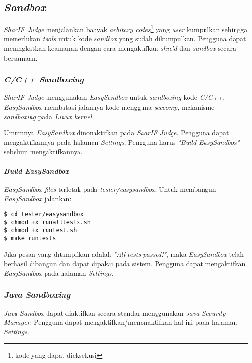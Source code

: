 \subsection{\textit{Sandbox}}
\label{subsec:sandbox}
\textit{SharIF Judge} menjalankan banyak \textit{arbitary codes}\footnote{kode yang dapat dieksekusi} yang \textit{user} kumpulkan sehingga memerlukan \textit{tools} untuk kode \textit{sandbox} yang sudah dikumpulkan. Pengguna dapat meningkatkan keamanan dengan cara mengaktifkan \textit{shield} dan \textit{sandbox} secara bersamaan.

\subsubsection{\textit{C/C++ Sandboxing}}
\label{subsubsec:sandbox_c/c++}
\textit{SharIF Judge} menggunakan \textit{EasySandbox} untuk \textit{sandboxing} kode \textit{C/C++}. \textit{EasySandbox} membatasi jalannya kode mengguna \textit{seccomp}, mekanisme \textit{sandboxing} pada \textit{Linux kernel}.

Umumnya \textit{EasySandbox} dinonaktifkan pada \textit{SharIF Judge}. Pengguna dapat mengaktifkannya pada halaman \textit{Settings}. Pengguna harus \textit{"Build EasySandbox"} sebelum mengaktifkannya.

\paragraph{\textit{Build EasySandbox}}

\textit{EasySandbox files} terletak pada \textit{tester/easysandbox}. Untuk membangun \textit{EasySandbox} jalankan:

\begin{lstlisting}[basicstyle=\ttfamily, frame=single,
columns=fullflexible, keepspaces=true, breaklines=true, label=ls:18]
$ cd tester/easysandbox
$ chmod +x runalltests.sh
$ chmod +x runtest.sh
$ make runtests
\end{lstlisting}

Jika pesan yang ditampilkan adalah \textit{"All tests passed!"}, maka \textit{EasySandbox} telah berhasil dibangun dan dapat dipakai pada sistem. Pengguna dapat mengaktifkan \textit{EasySandbox} pada halaman \textit{Settings}.

\subsubsection{\textit{Java Sandboxing}}
\label{subsubsec:java_sandbox}
\textit{Java Sandbox} dapat diaktifkan secara standar menggunakan \textit{Java Security Manager}. Pengguna dapat mengaktifkan/menonaktifkan hal ini pada halaman \textit{Settings}.

